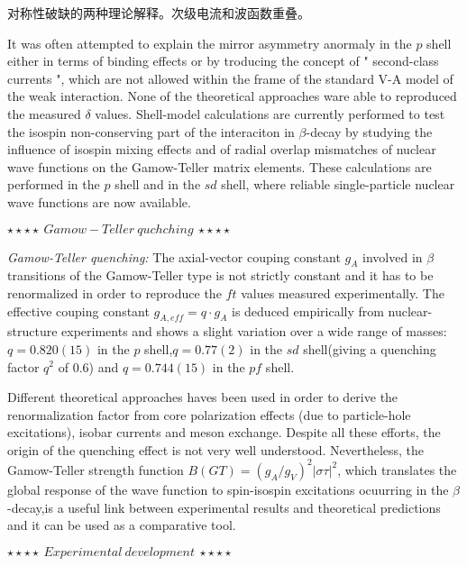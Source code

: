\documentclass[a4paper]{article}
\begin{document}
对称性破缺的两种理论解释。次级电流和波函数重叠。

It was often attempted to explain the mirror asymmetry anormaly in the $p$ shell either in terms of binding effects or by troducing the concept of " second-class currents ", which are not allowed within the frame of the standard V-A model of the weak interaction. None of the theoretical approaches ware able to reproduced the measured $\delta$ values. Shell-model calculations are currently performed to test the isospin non-conserving part of the interaciton in $\beta$-decay by studying the influence of isospin mixing effects and of radial overlap mismatches of nuclear wave functions on the Gamow-Teller matrix elements. These calculations are performed in the $p$ shell and in the $sd$ shell, where reliable single-particle nuclear wave functions are now available.


$\star\star\star\star~Gamow-Teller~quchching~\star\star\star\star$



\textit{Gamow-Teller quenching:} The axial-vector couping constant $g_{A}$ involved in $\beta$ transitions of the Gamow-Teller type is not strictly constant and it has to be renormalized in order to reproduce the $ft$ values measured experimentally. The effective couping constant $g_{A,eff}=q\cdot g_{A}$ is deduced empirically from nuclear-structure experiments and shows a slight variation over a wide range of masses: $q=0.820(15)$ in the $p$ shell,$q=0.77(2)$ in the $sd$ shell(giving a quenching factor $q^{2}$ of 0.6) and $q=0.744(15)$ in the $pf$ shell.

Different theoretical approaches haves been used in order to derive the renormalization factor from core polarization effects (due to particle-hole excitations), isobar currents and meson exchange. Despite all these efforts, the origin of the quenching effect is not very well understood. Nevertheless, the Gamow-Teller strength function $B(GT)=\left( g_{A}/g_{V} \right)^{2}\left| \sigma \tau  \right|^{2}$, which translates the global response of the wave function to spin-isospin excitations ocuurring in the $\beta$-decay,is a useful link between experimental results and theoretical predictions and it can be used as a comparative tool.

$\star\star\star\star~Experimental~development~\star\star\star\star$
\end{document}
